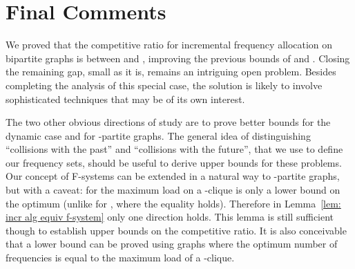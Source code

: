 \documentclass[11pt]{article}
\begin{document}
\section{Final Comments}

We proved that the competitive ratio for incremental frequency
allocation on bipartite graphs is between  and ,
improving the previous bounds of  and . Closing the
remaining gap, small as it is, remains an intriguing open problem. 
Besides completing the analysis of this special case, the
solution is likely to involve sophisticated techniques that may be of 
its own interest.

The two other obvious directions of study are to prove better bounds
for the dynamic case and for -partite graphs. The general idea
of distinguishing ``collisions with the past'' and 
``collisions with the future'', that we use to define our 
frequency sets, should be useful to derive upper bounds for these
problems. Our concept of
F-systems can be extended in a natural way to -partite graphs,
but with a caveat: for  the maximum load on a -clique
is only a lower bound on the optimum (unlike for , where the
equality holds).
Therefore in Lemma~\ref{lem: incr alg equiv f-system} only one
direction holds. This lemma is still sufficient though to establish
upper bounds on the competitive ratio. It is also conceivable that
a lower bound can be proved using graphs where the optimum
number of frequencies is equal to the maximum load of a -clique.




\end{document}
